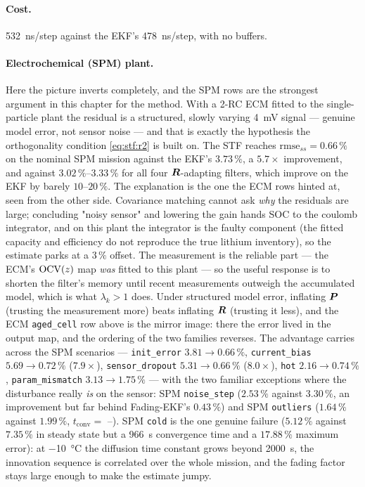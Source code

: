 \paragraph{Cost.}  \SI{532}{\nano\second}/step against the EKF's \SI{478}{\nano\second}/step, with no
buffers.

\paragraph{Electrochemical (SPM) plant.}  Here the picture inverts completely, and the SPM rows are
the strongest argument in this chapter for the method.  With a 2-RC ECM fitted to the single-particle
plant the residual is a structured, slowly varying \SI{4}{\milli\volt} signal --- genuine model error,
not sensor noise --- and that is exactly the hypothesis the orthogonality condition
\eqref{eq:stf:r2} is built on.  The STF reaches $\mathrm{rmse}_{ss}=\mathbf{0.66\,\%}$ on the nominal
SPM mission against the EKF's $3.73\,\%$, a $\mathbf{5.7\times}$ improvement, and against
$3.02\,\%$--$3.33\,\%$ for all four $\bm{R}$-adapting filters, which improve on the EKF by barely
$10$--$20\,\%$.  The explanation is the one the ECM rows hinted at, seen from the other side.
Covariance matching cannot ask \emph{why} the residuals are large; concluding "noisy sensor" and
lowering the gain hands SOC to the coulomb integrator, and on this plant the integrator is the faulty
component (the fitted capacity and efficiency do not reproduce the true lithium inventory), so the
estimate parks at a $3\,\%$ offset.  The measurement is the reliable part --- the ECM's
$\mathrm{OCV}(z)$ map \emph{was} fitted to this plant --- so the useful response is to shorten the
filter's memory until recent measurements outweigh the accumulated model, which is what
$\lambda_k>1$ does.  Under structured model error, inflating $\bm{P}$ (trusting the measurement more)
beats inflating $\bm{R}$ (trusting it less), and the ECM \texttt{aged\_cell} row above is the mirror
image: there the error lived in the output map, and the ordering of the two families reverses.  The
advantage carries across the SPM scenarios --- \texttt{init\_error} $3.81\to0.66\,\%$,
\texttt{current\_bias} $5.69\to0.72\,\%$ ($7.9\times$), \texttt{sensor\_dropout} $5.31\to0.66\,\%$
($8.0\times$), \texttt{hot} $2.16\to0.74\,\%$, \texttt{param\_mismatch} $3.13\to1.75\,\%$ --- with the
two familiar exceptions where the disturbance really \emph{is} on the sensor: SPM
\texttt{noise\_step} ($2.53\,\%$ against $3.30\,\%$, an improvement but far behind Fading-EKF's
$0.43\,\%$) and SPM \texttt{outliers} ($1.64\,\%$ against $1.99\,\%$, $t_\mathrm{conv}=$ --).  SPM
\texttt{cold} is the one genuine failure ($5.12\,\%$ against $7.35\,\%$ in steady state but a
\SI{966}{\second} convergence time and a $17.88\,\%$ maximum error): at \SI{-10}{\celsius} the
diffusion time constant grows beyond \SI{2000}{\second}, the innovation sequence is correlated over
the whole mission, and the fading factor stays large enough to make the estimate jumpy.

